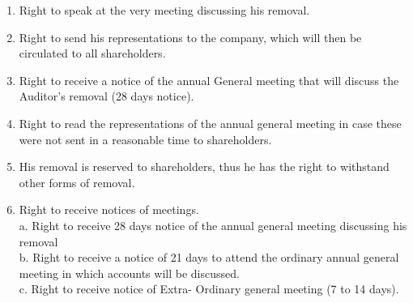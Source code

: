 \documentclass[10pt]{article}
\begin{document}
\begin{enumerate}
  During his removal he has the following rights\\
  \item Right to speak at the very meeting discussing his removal.\\
  \item Right to send his representations to the company, which will then be circulated to all shareholders.\\
  \item Right to receive a notice of the annual General meeting that will discuss the Auditor's removal (28 days notice).\\
  \item Right to read the representations of the annual general meeting in case these were not sent in a reasonable time to shareholders.\\
  \item His removal is reserved to shareholders, thus he has the right to withstand other forms of removal.\\
  \item Right to receive notices of meetings.\\
  a. Right to receive 28 days notice of the annual general meeting discussing his removal\\
  b. Right to receive a notice of 21 days to attend the ordinary annual general meeting in which accounts will be discussed.\\
  c. Right to receive notice of Extra- Ordinary general meeting (7 to 14 days).
\end{enumerate}
\end{document}
